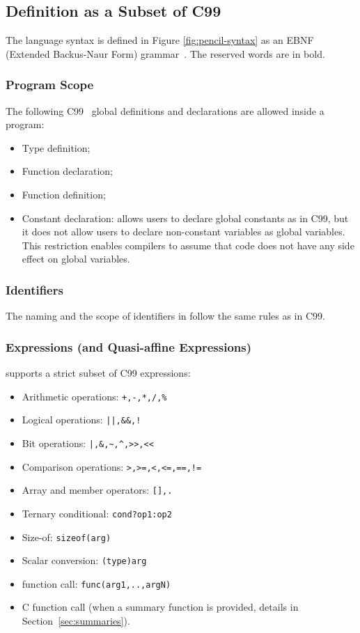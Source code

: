 \subsection{\pencil Definition as a Subset of C99}
\label{pencil-c99-subset}
The language syntax is defined in Figure \ref{fig:pencil-syntax} as an EBNF (Extended
Backus-Naur Form) grammar~\cite{wirth1996EBNF}.
The reserved words are in bold.



\subsubsection{Program Scope}
The following C99~\cite{c99} global definitions and declarations are allowed inside a
\pencil program:
\begin{itemize}
  \item Type definition;
  \item Function declaration;
  \item Function definition;
  \item Constant declaration: \pencil allows users to declare global constants
        as in C99, but it does not allow users to declare non-constant variables
        as global variables.
        This restriction enables \pencil compilers to
        assume that \pencil code does not have any side effect on global
        variables.
\end{itemize}

\subsubsection{Identifiers}
The naming and the scope of identifiers in \pencil follow the same rules as
in C99.

\subsubsection{Expressions (and Quasi-affine Expressions)}
\pencil supports a strict subset of C99 expressions:
\begin{itemize}
  \item Arithmetic operations: \lstinline!+,-,*,/,%!
  \item Logical operations: \lstinline{||,&&,!}
  \item Bit operations: \lstinline{|,&,~,^,>>,<<}
  \item Comparison operations: \lstinline{>,>=,<,<=,==,!=}
  \item Array and member operators: \lstinline{[],.}
  \item Ternary conditional: \lstinline!cond?op1:op2!
  \item Size-of: \lstinline!sizeof(arg)!
  \item Scalar conversion: \lstinline!(type)arg!
  \item \pencil function call: \lstinline!func(arg1,..,argN)!
  \item C function call (when a summary function is provided,
  details in Section~\ref{sec:summaries}).
\end{itemize}


